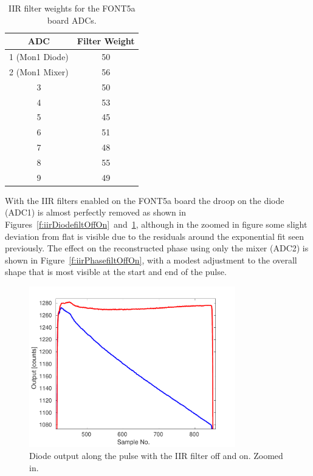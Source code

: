 \begin{table}
  \begin{center}
    \begin{tabular}{| c | c |}
	   \hline
       ADC & Filter Weight \\ \hline
       1 (Mon1 Diode) & 50 \\
	   2 (Mon1 Mixer) & 56 \\
	   3 & 50 \\
	   4 & 53 \\
	   5 & 45 \\
	   6 & 51 \\
	   7 & 48 \\
	   8 & 55 \\
	   9 & 49 \\
 	   \hline
    \end{tabular}
    \caption{IIR filter weights for the FONT5a board ADCs.}
  	\label{t:filtWeights}
  \end{center}
\end{table}

With the IIR filters enabled on the FONT5a board the droop on the diode (ADC1) is almost perfectly removed as shown in Figures~\ref{f:iirDiodefiltOffOn}~and~\ref{f:iirDiodefiltOffOn_zoom}, although in the zoomed in figure some slight deviation from flat is visible due to the residuals around the exponential fit seen previously. The effect on the reconstructed phase using only the mixer (ADC2) is shown in Figure~\ref{f:iirPhasefiltOffOn}, with a modest adjustment to the overall shape that is most visible at the start and end of the pulse.

\begin{figure}
  \centering
  \includegraphics[width=0.8\textwidth]{Figures/commissioning/iirDiodeFiltOffOn_zoom}
  \caption{Diode output along the pulse with the IIR filter off and on. Zoomed in.}
  \label{f:iirDiodefiltOffOn_zoom}
\end{figure}

